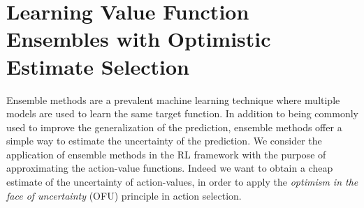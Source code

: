 
\section{Learning Value Function Ensembles with Optimistic Estimate Selection}
\label{sec:obe}
Ensemble methods \cite{opitz1999popular} are a prevalent machine learning technique where multiple models are used to learn the same target function. In addition to being commonly used to improve the generalization of the prediction, ensemble methods offer a simple way to estimate the uncertainty of the prediction. We consider the application of ensemble methods in the RL framework with the purpose of approximating the action-value functions.   
Indeed we want to obtain a cheap estimate of the uncertainty of action-values, in order to apply the \textsl{optimism in the face of uncertainty} (OFU) principle in action selection.

